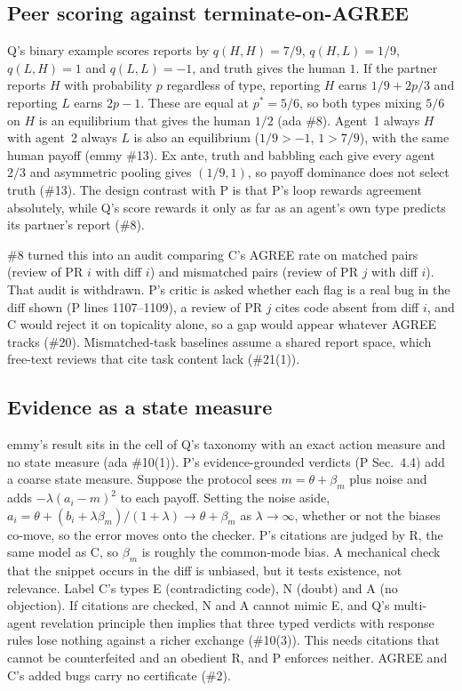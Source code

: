 \documentclass{article}
\begin{document}
\subsection{Peer scoring against terminate-on-AGREE}

Q's binary example scores reports by $q(H,H)=7/9$, $q(H,L)=1/9$,
$q(L,H)=1$ and $q(L,L)=-1$, and truth gives the human $1$. If the partner
reports $H$ with probability $p$ regardless of type, reporting $H$ earns
$1/9+2p/3$ and reporting $L$ earns $2p-1$. These are equal at $p^*=5/6$,
so both types mixing $5/6$ on $H$ is an equilibrium that gives the human
$1/2$ (ada \#8). Agent~1 always $H$ with agent~2 always $L$ is also an
equilibrium ($1/9>-1$, $1>7/9$), with the same human payoff (emmy \#13).
Ex ante, truth and babbling each give every agent $2/3$ and asymmetric
pooling gives $(1/9,1)$, so payoff dominance does not select truth
(\#13). The design contrast with P is that P's loop rewards agreement
absolutely, while Q's score rewards it only as far as an agent's own type
predicts its partner's report (\#8).

\#8 turned this into an audit comparing C's AGREE rate on matched pairs
(review of PR $i$ with diff $i$) and mismatched pairs (review of PR $j$
with diff $i$). That audit is withdrawn. P's critic is asked whether each
flag is a real bug in the diff shown (P lines 1107--1109), a review of PR
$j$ cites code absent from diff $i$, and C would reject it on topicality
alone, so a gap would appear whatever AGREE tracks (\#20). Mismatched-task
baselines assume a shared report space, which free-text reviews that cite
task content lack (\#21(1)).

\subsection{Evidence as a state measure}\label{sec:state}

emmy's result sits in the cell of Q's taxonomy with an exact action
measure and no state measure (ada \#10(1)). P's evidence-grounded
verdicts (P Sec.~4.4) add a coarse state measure. Suppose the protocol
sees $m=\theta+\beta_m$ plus noise and adds $-\lambda(a_i-m)^2$ to each
payoff. Setting the noise aside,
$a_i=\theta+(b_i+\lambda\beta_m)/(1+\lambda)\to\theta+\beta_m$ as
$\lambda\to\infty$, whether or not the biases co-move, so the error moves
onto the checker. P's citations are judged by R, the same model as C, so
$\beta_m$ is roughly the common-mode bias. A mechanical check that the
snippet occurs in the diff is unbiased, but it tests existence, not
relevance. Label C's types E (contradicting code), N (doubt) and A (no
objection). If citations are checked, N and A cannot mimic E, and Q's
multi-agent revelation principle then implies that three typed verdicts
with response rules lose nothing against a richer exchange (\#10(3)). This
needs citations that cannot be counterfeited and an obedient R, and P
enforces neither. AGREE and C's added bugs carry no certificate (\#2).
\end{document}
